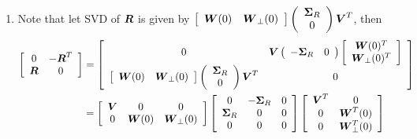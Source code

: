 \documentclass[11pt]{article}
\begin{document}
\begin{enumerate}
\item Note that let SVD of $\boldsymbol{R}$ is given by $\left[\begin{array}{cc}
\boldsymbol{W}(0) & \boldsymbol{W}_{\bot}(0)
\end{array}\right]\left(\begin{array}{c}
\boldsymbol{\Sigma}_{R} \\ 
0
\end{array} \right)\boldsymbol{V}^{T}$, then 
\begin{align*}
\left[\begin{array}{cc}
0 & -\boldsymbol{R}^{T} \\ 
\boldsymbol{R} & 0
\end{array}\right] &=  \left[\begin{array}{cc}
0 & \boldsymbol{V}\left(\begin{array}{cc}
-\boldsymbol{\Sigma}_{R} & 
0
\end{array} \right)\left[\begin{array}{c}
\boldsymbol{W}(0)^{T} \\ \boldsymbol{W}_{\bot}(0)^{T}
\end{array}\right] \\ 
\left[\begin{array}{cc}
\boldsymbol{W}(0) & \boldsymbol{W}_{\bot}(0)
\end{array}\right]\left(\begin{array}{c}
\boldsymbol{\Sigma}_{R} \\ 
0
\end{array} \right)\boldsymbol{V}^{T}& 0
\end{array}\right]\\
&= \left[\begin{array}{ccc}
\boldsymbol{V} & 0 & 0 \\ 
0 & \boldsymbol{W}(0) & \boldsymbol{W}_{\bot}(0)
\end{array} \right]  
\left[\begin{array}{ccc}
0 & -\boldsymbol{\Sigma}_{R} & 0 \\ 
\boldsymbol{\Sigma}_{R}& 0 & 0 \\ 
0 & 0 & 0
\end{array} \right]
\left[\begin{array}{cc}
\boldsymbol{V}^{T} &0\\
 0&  \boldsymbol{W}^{T}(0)\\ 
0 & \boldsymbol{W}_{\bot}^{T}(0)
\end{array} \right]
\end{align*}


\end{enumerate}
\end{document}
